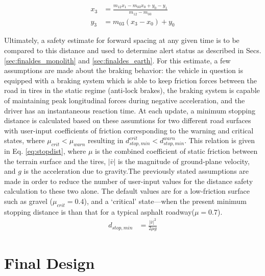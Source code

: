 \documentclass[12pt]{report}
\begin{document}
\begin{align} 
    x_3 &= \frac{ m_{12} x_1 - m_{03} x_0 + y_0 - y_1 } { m_{12} - m_{03} } \label{eq:devprojx} \\
    y_3 &= m_{03} (x_3 - x_0) + y_0 \label{eq:devprojy}
\end{align}

Ultimately, a safety estimate for forward spacing at any given time is to be compared to this distance and used to determine alert status as described in Secs. \ref{sec:finaldes_monolith} and \ref{sec:finaldes_earth}. For this estimate, a few assumptions are made about the braking behavior: the vehicle in question is equipped with a braking system which is able to keep friction forces between the road in tires in the static regime (anti-lock brakes), the braking system is capable of maintaining peak longitudinal forces during negative acceleration, and the driver has an instantaneous reaction time. At each update, a minimum stopping distance is calculated based on these assumtions for two different road surfaces with user-input coefficients of friction corresponding to the warning and critical states, where $\mu_{crit}<\mu_{warn}$ resulting in $d_{stop, min}^{crit} < d_{stop, min}^{warn}$. This relation is given in Eq. \ref{eq:stopdist}, where $\mu$  is the combined coefficient of static friction between the terrain surface and the tires,  $|\bar{v}|$ is the magnitude of ground-plane velocity, and $g$ is the acceleration due to gravity.The previously stated assumptions are made in order to reduce the number of user-input values for the distance safety calculation to these two alone. The default values are for a low-friction surface such as gravel ($\mu_{crit}=0.4$), and a `critical' state---when the present minimum stopping distance is than that for a typical asphalt roadway($\mu=0.7$). 
\begin{align} \label{eq:stopdist}
    d_{stop, min} &= \frac {|\bar{v}|^2} {2 \mu g}
\end{align}


\section{Final Design} \label{sec:finaldes}

\end{document}

